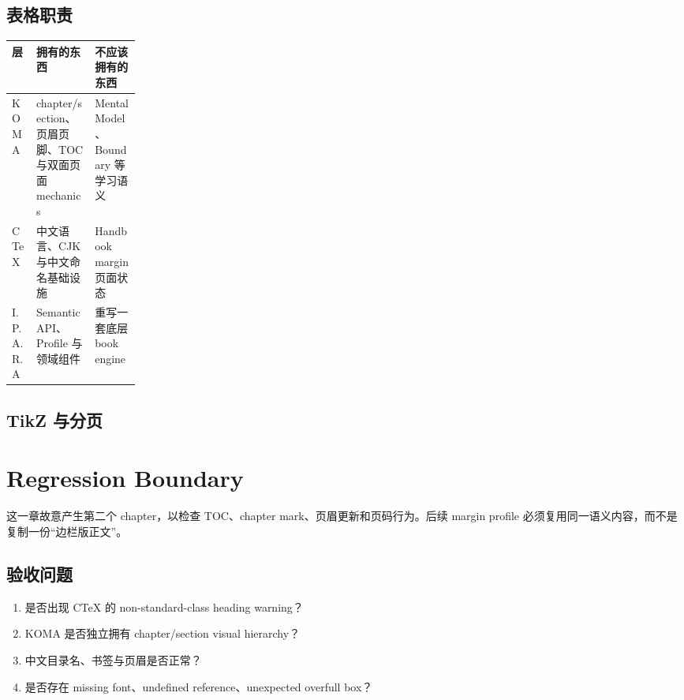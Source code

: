 \documentclass[
  11pt,
  a4paper,
  open=any,
  headinclude=true,
  footinclude=false,
  headheight=18pt,
  footheight=18pt,
  DIV=11
]{scrbook}
\begin{document}
\section{表格职责}

\begin{center}
\small
\begin{tabularx}{\linewidth}{@{}p{0.19\linewidth}YY@{}}
\toprule
\textbf{层} & \textbf{拥有的东西} & \textbf{不应该拥有的东西}\\
\midrule
KOMA & chapter/section、页眉页脚、TOC 与双面页面 mechanics & Mental Model、Boundary 等学习语义\\
CTeX & 中文语言、CJK 与中文命名基础设施 & Handbook margin 页面状态\\
I.P.A.R.A & Semantic API、Profile 与领域组件 & 重写一套底层 book engine\\
\bottomrule
\end{tabularx}
\end{center}

\section{TikZ 与分页}

\begin{center}
\end{center}

\chapter{Regression Boundary}

这一章故意产生第二个 chapter，以检查 TOC、chapter mark、页眉更新和页码行为。后续 margin profile 必须复用同一语义内容，而不是复制一份“边栏版正文”。

\section{验收问题}

\begin{enumerate}
  \item 是否出现 CTeX 的 non-standard-class heading warning？
  \item KOMA 是否独立拥有 chapter/section visual hierarchy？
  \item 中文目录名、书签与页眉是否正常？
  \item 是否存在 missing font、undefined reference、unexpected overfull box？
\end{enumerate}
\end{document}
